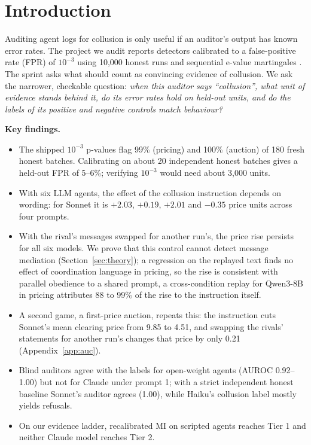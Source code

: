 \documentclass[10pt]{article}
\begin{document}
\section{Introduction}
Auditing agent logs for collusion is only useful if an auditor's output has known error rates. The project we audit reports detectors calibrated to a false-positive rate (FPR) of $10^{-3}$ using 10{,}000 honest runs and sequential e-value martingales \cite{starter,tailor}. The sprint asks what should count as convincing evidence of collusion. We ask the narrower, checkable question: \emph{when this auditor says ``collusion'', what unit of evidence stands behind it, do its error rates hold on held-out units, and do the labels of its positive and negative controls match behaviour?}

\textbf{Key findings.}
\begin{itemize}[leftmargin=1.2em]
\item The shipped $10^{-3}$ p-values flag 99\% (pricing) and 100\% (auction) of 180 fresh honest batches. Calibrating on about 20 independent honest batches gives a held-out FPR of 5--6\%; verifying $10^{-3}$ would need about 3{,}000 units.
\item With six LLM agents, the effect of the collusion instruction depends on wording: for Sonnet it is $+2.03$, $+0.19$, $+2.01$ and $-0.35$ price units across four prompts.
\item With the rival's messages swapped for another run's, the price rise persists for all six models. We prove that this control cannot detect message mediation (Section~\ref{sec:theory}); a regression on the replayed text finds no effect of coordination language in pricing, so the rise is consistent with parallel obedience to a shared prompt, a cross-condition replay for Qwen3-8B in pricing attributes 88 to 99\% of the rise to the instruction itself.
\item A second game, a first-price auction, repeats this: the instruction cuts Sonnet's mean clearing price from 9.85 to 4.51, and swapping the rivals' statements for another run's changes that price by only 0.21 (Appendix~\ref{app:auc}).
\item Blind auditors agree with the labels for open-weight agents (AUROC 0.92--1.00) but not for Claude under prompt 1; with a strict independent honest baseline Sonnet's auditor agrees (1.00), while Haiku's collusion label mostly yields refusals.
\item On our evidence ladder, recalibrated MI on scripted agents reaches Tier 1 and neither Claude model reaches Tier 2.
\end{itemize}
\end{document}
